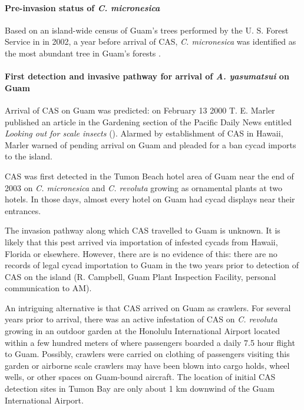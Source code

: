 \documentclass[12pt,letterpaper,english,bibliography=totocnumbered, abstract=on]{scrartcl}
\begin{document}
\paragraph{Pre-invasion status of \textit{C. micronesica}}

Based on an island-wide census of Guam's trees performed by the U. S. Forest Service in in 2002, a year before arrival of CAS, \textit{C. micronesica} was identified as the most abundant tree in Guam's forests \cite{donnegon_guams_2004}. 

%

\paragraph{First detection and invasive pathway for arrival of \textit{A. yasumatsui} on Guam} 

Arrival of CAS on Guam was predicted: on February 13 2000 T. E. Marler published an article in the Gardening section of the Pacific Daily News entitled \textit{Looking out for scale insects} (\cite{haynesExoticInvasivePest2005}). Alarmed by establishment of CAS in Hawaii, Marler warned of pending arrival on Guam and pleaded for a ban cycad imports to the island. 

CAS was first detected in the Tumon Beach hotel area of Guam near the end of 2003 on \textit{C. micronesica} and \textit{C. revoluta} growing as ornamental plants at two hotels. In those days, almost every hotel on Guam had cycad displays near their entrances.

The invasion pathway along which CAS travelled to Guam is unknown.
It is likely that this pest arrived via importation of infested cycads from Hawaii, Florida or elsewhere. However, there are is no evidence of this: there are no records of legal cycad importation to Guam in the two years prior to detection of CAS on the island (R. Campbell, Guam Plant Inspection Facility, personal communication to AM).  

An intriguing alternative is that CAS arrived on Guam as crawlers. For several years prior to arrival, there was an active infestation of CAS on \textit{C. revoluta} growing in an outdoor garden at the Honolulu International Airport located within a few hundred meters of where passengers boarded a daily 7.5 hour flight to Guam. Possibly, crawlers were carried on clothing of passengers visiting this garden or airborne scale crawlers may have been blown into cargo holds, wheel wells, or other spaces on Guam-bound aircraft. The location of initial CAS detection sites in Tumon Bay are only about 1 km downwind of the Guam International Airport.
\end{document}
